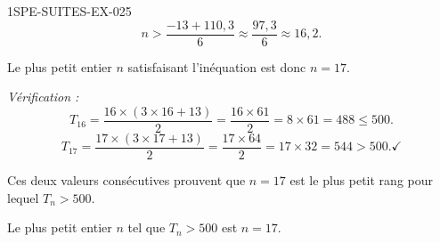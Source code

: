 \begin{corrige}{1SPE-SUITES-EX-025}
\[
  n > \frac{-13 + 110{,}3}{6} \approx \frac{97{,}3}{6} \approx 16{,}2.
\]

Le plus petit entier $n$ satisfaisant l'inéquation est donc $n = 17$.

\textit{Vérification :}
\[
  T_{16} = \frac{16 \times (3 \times 16 + 13)}{2} = \frac{16 \times 61}{2} = 8 \times 61 = 488 \leq 500.
\]
\[
  T_{17} = \frac{17 \times (3 \times 17 + 13)}{2} = \frac{17 \times 64}{2} = 17 \times 32 = 544 > 500. \checkmark
\]

Ces deux valeurs consécutives prouvent que $n=17$ est le plus petit rang pour lequel $T_n > 500$.

Le plus petit entier $n$ tel que $T_n > 500$ est $\boxed{n = 17}$.

\end{corrige}
